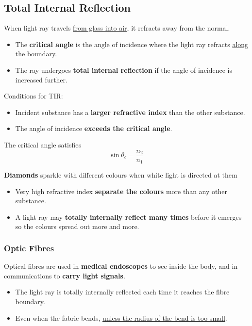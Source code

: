 \subsection{Total Internal Reflection}

When light ray travels \underline{from glass into air}, it refracts away from the normal.
\begin{itemize}
    \item The \textbf{critical angle} is the angle of incidence where the light ray refracts \underline{along the boundary}.
    \item The ray undergoes \textbf{total internal reflection} if the angle of incidence is increased further.
\end{itemize}

Conditions for TIR:
\begin{itemize}
    \item Incident substance has a \textbf{larger refractive index} than the other substance.
    \item The angle of incidence \textbf{exceeds the critical angle}.
\end{itemize}

The critical angle satisfies
$$\sin\theta_c=\frac{n_2}{n_1}$$

\textbf{Diamonds} sparkle with different colours when white light is directed at them
\begin{itemize}
    \item Very high refractive index \textbf{separate the colours} more than any other substance.
    \item A light ray may \textbf{totally internally reflect many times} before it emerges so the colours spread out more and more.
\end{itemize}

\subsubsection*{Optic Fibres}

Optical fibres are used in \textbf{medical endoscopes} to see inside the body, and in communications to \textbf{carry light signals}.
\begin{itemize}
    \item The light ray is totally internally reflected each time it reaches the fibre boundary.
    \item Even when the fabric bends, \underline{unless the radius of the bend is too small}.
\end{itemize}

